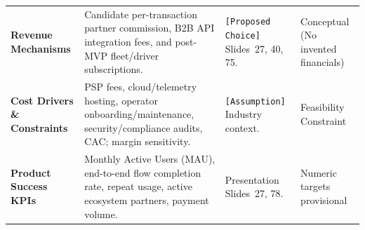 \begin{table}[htbp]
\begin{tabularx}{\linewidth}{@{}P{30mm} L P{34mm} P{26mm}@{}}
    \midrule
    \textbf{Revenue Mechanisms} & Candidate per-transaction partner commission, B2B API integration fees, and post-MVP fleet/driver subscriptions. & \texttt{[Proposed Choice]} Slides~27, 40, 75. & Conceptual (No invented financials) \\
    \textbf{Cost Drivers \& Constraints} & PSP fees, cloud/telemetry hosting, operator onboarding/maintenance, security/compliance audits, CAC; margin sensitivity. & \texttt{[Assumption]} Industry context. & Feasibility Constraint \\
    \textbf{Product Success KPIs} & Monthly Active Users (MAU), end-to-end flow completion rate, repeat usage, active ecosystem partners, payment volume. & Presentation Slides~27, 78. & Numeric targets provisional \\
    \bottomrule
  \end{tabularx}
\end{table}
